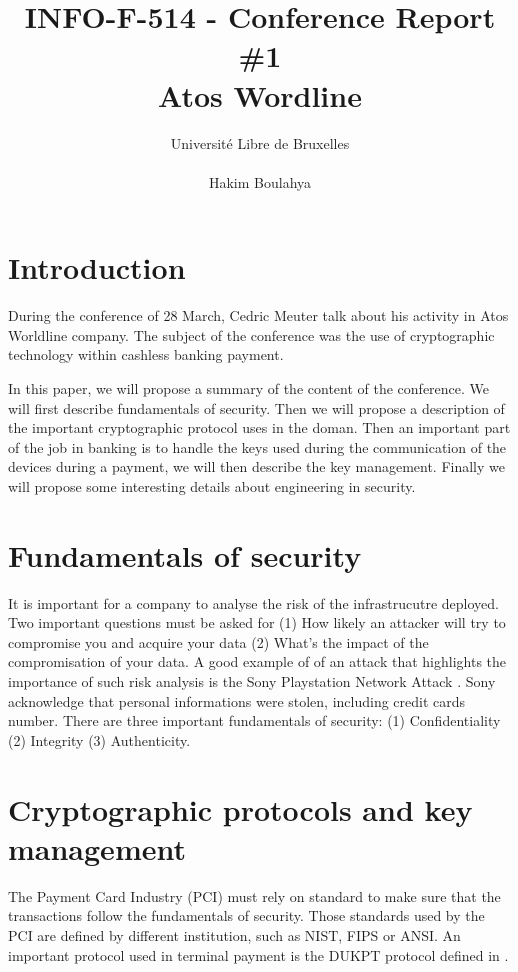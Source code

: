 \documentclass[10pt,a4paper]{article}
\title{INFO-F-514 - Conference Report \#1 \\
Atos Wordline}
\author{Université Libre de Bruxelles \\
\\ Hakim Boulahya}
\begin{document}
\maketitle

\newpage

\section{Introduction}

During the conference of 28 March, Cedric Meuter
talk about his activity in Atos Worldline company.
The subject of the conference was the use of
cryptographic technology within cashless banking payment.

In this paper, we will propose a summary of the content of the
conference. We will first describe fundamentals of security.
Then we will propose a description of the important
cryptographic protocol uses in the doman. Then an important
part of the job in banking is to handle the keys used
during the communication of the devices during a payment,
we will then describe the key management.
Finally we will propose some interesting details about
engineering in security.


\section{Fundamentals of security}

It is important for a company to analyse the risk
of the infrastrucutre deployed. Two important questions must
be asked for (1) How likely an attacker will try to compromise
you and acquire your data (2) What's the impact of the compromisation
of your data. A good example of of an attack that highlights
the importance of such risk analysis is the Sony Playstation Network
Attack \cite{raiu_cyber-threat_2012}. Sony acknowledge that
personal informations were stolen, including credit cards number.
There are three important fundamentals of security:
(1) Confidentiality (2) Integrity (3) Authenticity.

\section{Cryptographic protocols and key management}

The Payment Card Industry (PCI) must rely on standard to make
sure that the transactions follow the fundamentals of security.
Those standards used by the PCI are defined by different institution, such
as NIST, FIPS or ANSI. An important protocol used in terminal payment
is the DUKPT protocol defined in \cite{dukpt_std}.
\end{document}
